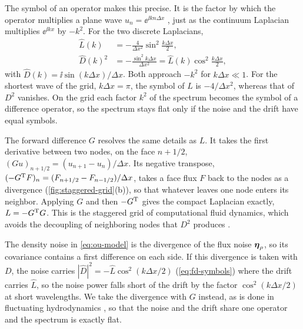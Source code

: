 \documentclass[aps,pre,reprint,superscriptaddress,longbibliography,nofootinbib
]{revtex4-2}
\begin{document}
The symbol of an operator makes this precise. It is the
factor by which the operator multiplies a plane wave
$u_n=\ee^{\ii kn\Delta x}$ \cite{leveque2007finite}, just
as the continuum Laplacian multiplies $\ee^{\ii kx}$ by
$-k^2$. For the two discrete Laplacians,
\begin{align}
  \hat L(k)&=-\frac{4}{\Delta x^2}\sin^2\frac{k\Delta x}{2},
  \nonumber\\
  \label{eq:fd-symbols}
  \hat D(k)^2&=-\frac{\sin^2k\Delta x}{\Delta x^2}=\hat L(k)\cos^2\frac{k\Delta x}{2},
\end{align}
with $\hat D(k)=\ii\sin(k\Delta x)/\Delta x$. Both approach
$-k^2$ for $k\Delta x\ll1$. For the shortest wave of the
grid, $k\Delta x=\pi$, the symbol of $L$ is $-4/\Delta
x^2$, whereas that of $D^2$ vanishes. On the grid each
factor $k^2$ of the spectrum becomes the symbol of a
difference operator, so the spectrum stays flat only if the
noise and the drift have equal symbols.

The forward difference $G$ resolves the same details as
$L$. It takes the first derivative between two nodes, on
the face $n+1/2$, $(Gu)_{n+1/2}=(u_{n+1}-u_n)/\Delta x$.
Its negative transpose, $(-G^{\mathrm{T}}
F)_n=(F_{n+1/2}-F_{n-1/2})/\Delta x$, takes a face flux $F$
back to the nodes as a divergence
(\cref{fig:staggered-grid}(b)), so that whatever leaves one
node enters its neighbor. Applying $G$ and then $-G^{\mathrm{T}}$
gives the compact Laplacian exactly, $L=-G^{\mathrm{T}} G$. This is
the staggered grid of computational fluid dynamics, which
avoids the decoupling of neighboring nodes that $D^2$
produces \cite{ferziger2020computational}.

The density noise in \cref{eq:ou-model} is the divergence
of the flux noise $\boldsymbol\eta_\rho$, so its covariance contains
a first difference on each side. If this divergence is
taken with $D$, the noise carries $|\hat D|^2=-\hat
L\cos^2(k\Delta x/2)$ (\cref{eq:fd-symbols}) where the
drift carries $\hat L$, so the noise power falls short of
the drift by the factor $\cos^2(k\Delta x/2)$ at short
wavelengths. We take the divergence with $G$ instead, as is
done in fluctuating hydrodynamics
\cite{donev2010accuracy,balboa2012staggered,
kim2017stochastic}, so that the noise and the drift share
one operator and the spectrum is exactly flat.
\end{document}
